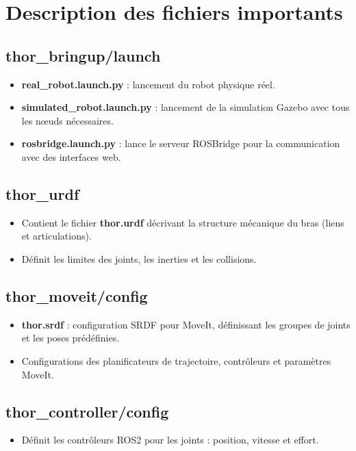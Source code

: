 \documentclass[a4paper,12pt]{article}
\numberwithin{equation}{section}
\begin{document}
\section{Description des fichiers importants}

\subsection{thor\_bringup/launch}
\begin{itemize}
    \item \textbf{real\_robot.launch.py} : lancement du robot physique réel.
    \item \textbf{simulated\_robot.launch.py} : lancement de la simulation Gazebo avec tous les nœuds nécessaires.
    \item \textbf{rosbridge.launch.py} : lance le serveur ROSBridge pour la communication avec des interfaces web.
\end{itemize}

\subsection{thor\_urdf}
\begin{itemize}
    \item Contient le fichier \textbf{thor.urdf} décrivant la structure mécanique du bras (liens et articulations).
    \item Définit les limites des joints, les inerties et les collisions.
\end{itemize}

\subsection{thor\_moveit/config}
\begin{itemize}
    \item \textbf{thor.srdf} : configuration SRDF pour MoveIt, définissant les groupes de joints et les poses prédéfinies.
    \item Configurations des planificateurs de trajectoire, contrôleurs et paramètres MoveIt.
\end{itemize}

\subsection{thor\_controller/config}
\begin{itemize}
    \item Définit les contrôleurs ROS2 pour les joints : position, vitesse et effort.
\end{itemize}
\end{document}

